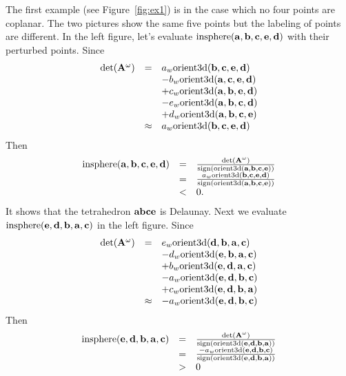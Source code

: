 The first example (see Figure~\ref{fig:ex1}) is in the case which no four points are coplanar. The two pictures show the same five points but the labeling of points are different.  In the left figure, let's evaluate $\textrm{insphere}({\bf a}, {\bf b}, {\bf c}, {\bf e}, {\bf d})$ with their perturbed points. Since
\[
\begin{array}{rcl}
\textrm{det}({\bf A}^{\omega}) &=& 
a_w\textrm{orient3d}({\bf b}, {\bf c}, {\bf e}, {\bf d})\\
& & -b_w\textrm{orient3d}({\bf a}, {\bf c}, {\bf e}, {\bf d})\\
& & +c_w\textrm{orient3d}({\bf a}, {\bf b}, {\bf e}, {\bf d})\\
& & -e_w\textrm{orient3d}({\bf a}, {\bf b}, {\bf c}, {\bf d})\\
& & +d_w\textrm{orient3d}({\bf a}, {\bf b}, {\bf c}, {\bf e})\\
&\approx& a_w\textrm{orient3d}({\bf b}, {\bf c}, {\bf e}, {\bf d})
\end{array}
\]
Then
\[
\begin{array}{rcl}
\textrm{insphere}({\bf a}, {\bf b}, {\bf c}, {\bf e}, {\bf d}) &=&
\frac{\textrm{det}({\bf A}^{\omega})}{\textrm{sign}(\textrm{orient3d}({\bf a}, {\bf b}, {\bf c}, {\bf e}))}\\
&=& \frac{a_w\textrm{orient3d}({\bf b}, {\bf c}, {\bf e}, {\bf d})}{\textrm{sign}\left(\textrm{orient3d}({\bf a}, {\bf b}, {\bf c}, {\bf e})\right)}\\
&<& 0.
\end{array}
\]
It shows that the tetrahedron ${\bf abce}$ is Delaunay. Next we evaluate $\textrm{insphere}({\bf e}, {\bf d}, {\bf b}, {\bf a}, {\bf c})$ in the left figure. Since
\[
\begin{array}{rcl}
\textrm{det}({\bf A}^{\omega}) &=& 
e_w\textrm{orient3d}({\bf d}, {\bf b}, {\bf a}, {\bf c})\\
& & -d_w\textrm{orient3d}({\bf e}, {\bf b}, {\bf a}, {\bf c})\\
& & +b_w\textrm{orient3d}({\bf e}, {\bf d}, {\bf a}, {\bf c})\\
& & -a_w\textrm{orient3d}({\bf e}, {\bf d}, {\bf b}, {\bf c})\\
& & +c_w\textrm{orient3d}({\bf e}, {\bf d}, {\bf b}, {\bf a})\\
&\approx& -a_w\textrm{orient3d}({\bf e}, {\bf d}, {\bf b}, {\bf c})
\end{array}
\]
Then
\[
\begin{array}{rcl}
\textrm{insphere}({\bf e}, {\bf d}, {\bf b}, {\bf a}, {\bf c}) &=&
\frac{\textrm{det}({\bf A}^{\omega})}{\textrm{sign}\left(\textrm{orient3d}({\bf e}, {\bf d}, {\bf b}, {\bf a})\right)}\\
&=& \frac{-a_w\textrm{orient3d}({\bf e}, {\bf d}, {\bf b}, {\bf c})}{\textrm{sign}\left(\textrm{orient3d}({\bf e}, {\bf d}, {\bf b}, {\bf a})\right)}\\
&>& 0
\end{array}
\]

